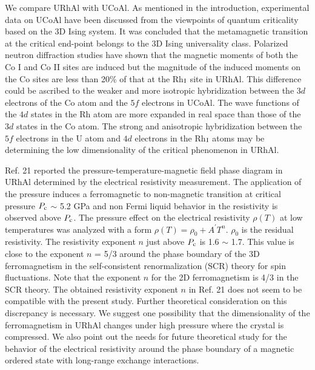 \documentclass[twocolumn,showpacs,preprintnumbers,amsmath,amssymb]{revtex4}
\begin{document}
  We compare URhAl with UCoAl. As mentioned in the introduction, experimental data on UCoAl have been discussed from the viewpoints of quantum criticality based on the 3D Ising system\cite{aoki,matsuda2,nohara,karube1,matsuda3,morales,combier1,takeda,karube2,shimizu1,kimura,combier2}. It was concluded that the metamagnetic transition at the critical end-point belongs to the 3D Ising universality class\cite{karube1}. Polarized neutron diffraction studies have shown that the magnetic moments of both the Co I and Co II sites are induced but the magnitude of the induced moments on the Co sites are less than 20{\%} of that at the Rh$_{\rm I}$ site in URhAl\cite{javorsky1,papoular}. This difference could be ascribed to the weaker and more isotropic hybridization between the $3d$ electrons of the Co atom and the $5f$ electrons in UCoAl. The wave functions of the $4d$ states in the Rh atom are more expanded in real space than those of the $3d$ states in the Co atom. The strong and anisotropic hybridization between the $5f$ electrons in the U atom and $4d$ electrons in the Rh$_{\rm I}$ atoms may be determining the low dimensionality of the critical phenomenon in URhAl.
    
    
    
    

 Ref. 21 reported the pressure-temperature-magnetic field phase diagram in URhAl determined by the electrical resistivity measurement\cite{shimizu2}. The application of the pressure induces a ferromagnetic to  non-magnetic transition at critical pressure $P_{\rm c}$ $\sim$ 5.2 GPa and non Fermi liquid behavior in the resistivity is observed above $P_{\rm c}$. The pressure effect on the electrical resistivity ${\rho}(T)$ at low temperatures was analyzed with a form ${\rho}(T)={{\rho}_0}+{A^{'}}T^n$. ${{\rho}_0}$ is the residual resistivity. The resistivity exponent $n$ just above $P_{\rm c}$ is 1.6 $\sim$ 1.7. This value is close to the exponent $n$ = 5/3 around the phase boundary of the 3D ferromagnetism in the self-consistent renormalization (SCR) theory for spin fluctuations\cite{moriya1}. Note that the exponent $n$ for the 2D ferromagnetism is 4/3 in the SCR theory\cite{hatatani}. The obtained resistivity exponent $n$ in Ref. 21 does not seem to be compatible with the present study. Further theoretical consideration on this discrepancy is necessary. We suggest one possibility that the dimensionality of the ferromagnetism in URhAl changes under high pressure where the crystal is compressed. We also point out the needs for future theoretical study for the behavior of the electrical resistivity around the phase boundary of a magnetic ordered state with long-range exchange interactions. 
 
\end{document}
